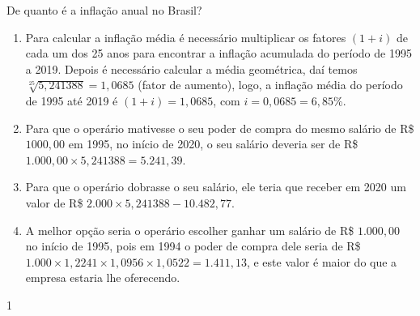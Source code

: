 \begin{resposta}{De quanto é a inflação anual no Brasil?}
{
  \begin{enumerate}
    \item Para calcular a inflação média é necessário multiplicar os fatores $(1+i)$ de cada um dos 25 anos para encontrar a inflação acumulada do período de 1995 a 2019. Depois é necessário calcular a média geométrica, daí temos $\sqrt[25]{5{,}241388}=1{,}0685$ (fator de aumento), logo, a inflação média do período de 1995 até 2019 é $(1+i)=1{,}0685$, com $i=0{,}0685=6{,}85$\%.
    \item Para que o operário mativesse o seu poder de compra do mesmo salário de R\$ $1000{,}00$ em 1995, no início de 2020, o seu salário deveria ser de R\$ $1.000{,}00\times5{,}241388=5.241{,}39$.
    \item Para que o operário dobrasse o seu salário, ele teria que receber em 2020 um valor de R\$ $2.000\times 5{,}241388-10.482{,}77$.
    \item A melhor opção seria o operário escolher ganhar um salário de R\$ $1.000{,}00$ no início de 1995, pois em 1994 o poder de compra dele seria de R\$ $1.000\times1{,}2241\times1{,}0956\times 1{,}0522=1.411{,}13$, e este valor é maior do que a empresa estaria lhe oferecendo.
  \end{enumerate}
}{1}
\end{resposta}

